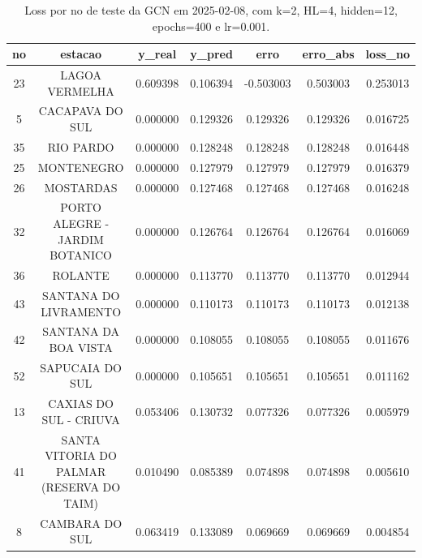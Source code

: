 \begin{table}[h]
\centering
\caption{Loss por no de teste da GCN em 2025-02-08, com k=2, HL=4, hidden=12, epochs=400 e lr=0.001.}
\label{tab:gcn_loss_k2_hl4_h12_e400_d20250208}
\begin{tabular}{ccccccc}
\toprule
no & estacao & y\_real & y\_pred & erro & erro\_abs & loss\_no \\
\midrule
23 & LAGOA VERMELHA & 0.609398 & 0.106394 & -0.503003 & 0.503003 & 0.253013 \\
5 & CACAPAVA DO SUL & 0.000000 & 0.129326 & 0.129326 & 0.129326 & 0.016725 \\
35 & RIO PARDO & 0.000000 & 0.128248 & 0.128248 & 0.128248 & 0.016448 \\
25 & MONTENEGRO & 0.000000 & 0.127979 & 0.127979 & 0.127979 & 0.016379 \\
26 & MOSTARDAS & 0.000000 & 0.127468 & 0.127468 & 0.127468 & 0.016248 \\
32 & PORTO ALEGRE - JARDIM BOTANICO & 0.000000 & 0.126764 & 0.126764 & 0.126764 & 0.016069 \\
36 & ROLANTE & 0.000000 & 0.113770 & 0.113770 & 0.113770 & 0.012944 \\
43 & SANTANA DO LIVRAMENTO & 0.000000 & 0.110173 & 0.110173 & 0.110173 & 0.012138 \\
42 & SANTANA DA BOA VISTA & 0.000000 & 0.108055 & 0.108055 & 0.108055 & 0.011676 \\
52 & SAPUCAIA DO SUL & 0.000000 & 0.105651 & 0.105651 & 0.105651 & 0.011162 \\
13 & CAXIAS DO SUL - CRIUVA & 0.053406 & 0.130732 & 0.077326 & 0.077326 & 0.005979 \\
41 & SANTA VITORIA DO PALMAR (RESERVA DO TAIM) & 0.010490 & 0.085389 & 0.074898 & 0.074898 & 0.005610 \\
8 & CAMBARA DO SUL & 0.063419 & 0.133089 & 0.069669 & 0.069669 & 0.004854 \\
\bottomrule
\end{tabular}
\end{table}
